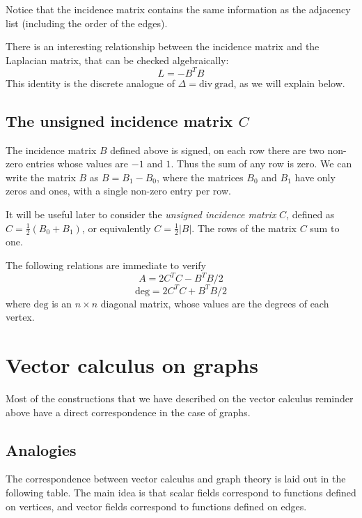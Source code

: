 Notice that the incidence matrix contains the same information as the
adjacency list (including the order of the edges).



There is an interesting relationship between the incidence matrix and the
Laplacian matrix, that can be checked algebraically:
\[
L = -B^TB
\]
This identity is the discrete analogue of $\Delta=\mathrm{div\ grad}$,
as we will explain below.



\subsection{The unsigned incidence matrix $C$}


The incidence matrix $B$ defined above is signed, on each row there are two
non-zero entries whose values are $-1$ and $1$.  Thus the sum of any row is
zero.
We can write the matrix $B$ as $B=B_1-B_0$, where the matrices
$B_0$ and $B_1$ have only zeros and ones, with a single non-zero entry per
row.



It will be useful later to consider the \emph{unsigned incidence matrix}
$C$, defined as $C=\frac{1}{2}(B_0 + B_1)$, or equivalently
$C=\frac{1}{2}|B|$.  The rows of the matrix $C$ sum to one.



The following relations are immediate to verify
\[
A = 2C^TC-B^TB/2
\]
\[
\mathrm{deg} = 2C^TC+B^TB/2
\]
where $\mathrm{deg}$ is an $n\times n$ diagonal matrix, whose values are the
degrees of each vertex.



\section{Vector calculus on graphs}


Most of the constructions that we have described on the vector calculus
reminder above have a direct correspondence in the case of graphs.


\subsection{Analogies}


The correspondence between vector calculus and graph theory is laid out in
the following table.
The main idea is that scalar fields correspond to
functions defined on vertices, and vector fields correspond to functions
defined on edges.

